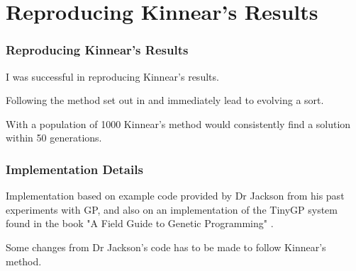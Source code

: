 \documentclass{beamer}
\begin{document}
	\section{Reproducing Kinnear's Results}
	
		\begin{frame}
		
			\frametitle{Reproducing Kinnear's Results}
			
			I was successful in reproducing Kinnear's results.
			
			\pause
			
			Following the method set out in \cite{kinnear_generality_1993} and \cite{kinnear_evolving_1993} immediately lead to evolving a sort.
			
			\pause
			
			With a population of 1000 Kinnear's method would consistently find a solution within 50 generations.
			
		\end{frame}
	
		\begin{frame}
		
			\frametitle{Implementation Details}
			
			Implementation based on example code provided by Dr Jackson from his past experiments with GP, and also on an implementation of the TinyGP system found in the book "A Field Guide to Genetic Programming" \cite{poli_field_2008}.
			
			Some changes from Dr Jackson's code has to be made to follow Kinnear's method.
		
		\end{frame}
	
\end{document}
